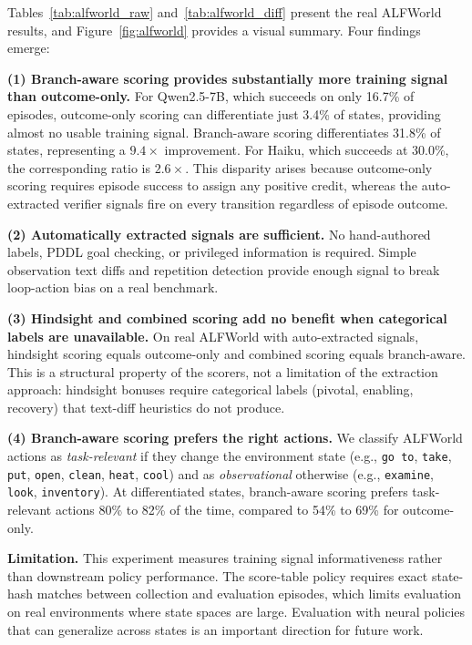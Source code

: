 \documentclass[11pt]{article}
\begin{document}
Tables~\ref{tab:alfworld_raw} and~\ref{tab:alfworld_diff} present the real ALFWorld results, and Figure~\ref{fig:alfworld} provides a visual summary. Four findings emerge:

\textbf{(1) Branch-aware scoring provides substantially more training signal than outcome-only.} For Qwen2.5-7B, which succeeds on only 16.7\% of episodes, outcome-only scoring can differentiate just 3.4\% of states, providing almost no usable training signal. Branch-aware scoring differentiates 31.8\% of states, representing a $9.4\times$ improvement. For Haiku, which succeeds at 30.0\%, the corresponding ratio is $2.6\times$. This disparity arises because outcome-only scoring requires episode success to assign any positive credit, whereas the auto-extracted verifier signals fire on every transition regardless of episode outcome.

\textbf{(2) Automatically extracted signals are sufficient.} No hand-authored labels, PDDL goal checking, or privileged information is required. Simple observation text diffs and repetition detection provide enough signal to break loop-action bias on a real benchmark.

\textbf{(3) Hindsight and combined scoring add no benefit when categorical labels are unavailable.} On real ALFWorld with auto-extracted signals, hindsight scoring equals outcome-only and combined scoring equals branch-aware. This is a structural property of the scorers, not a limitation of the extraction approach: hindsight bonuses require categorical labels (pivotal, enabling, recovery) that text-diff heuristics do not produce.

\textbf{(4) Branch-aware scoring prefers the right actions.} We classify ALFWorld actions as \emph{task-relevant} if they change the environment state (e.g., \texttt{go to}, \texttt{take}, \texttt{put}, \texttt{open}, \texttt{clean}, \texttt{heat}, \texttt{cool}) and as \emph{observational} otherwise (e.g., \texttt{examine}, \texttt{look}, \texttt{inventory}). At differentiated states, branch-aware scoring prefers task-relevant actions 80\% to 82\% of the time, compared to 54\% to 69\% for outcome-only.

\textbf{Limitation.} This experiment measures training signal informativeness rather than downstream policy performance. The score-table policy requires exact state-hash matches between collection and evaluation episodes, which limits evaluation on real environments where state spaces are large. Evaluation with neural policies that can generalize across states is an important direction for future work.
\end{document}

